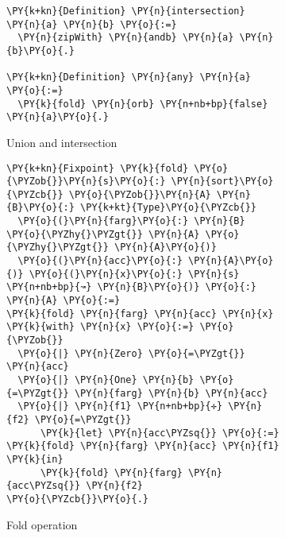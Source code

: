 \begin{figure}
\begin{subfigure}{0.3\textwidth}
\begin{Verbatim}[commandchars=\\\{\}]
\PY{k+kn}{Definition} \PY{n}{intersection} \PY{n}{a} \PY{n}{b} \PY{o}{:=}
  \PY{n}{zipWith} \PY{n}{andb} \PY{n}{a} \PY{n}{b}\PY{o}{.}

\PY{k+kn}{Definition} \PY{n}{any} \PY{n}{a} \PY{o}{:=}
  \PY{k}{fold} \PY{n}{orb} \PY{n+nb+bp}{false} \PY{n}{a}\PY{o}{.}
\end{Verbatim}
  \caption{Union and intersection}
  \label{code:union-intersect}
\end{subfigure}
%
\begin{subfigure}{0.5\textwidth}
\begin{Verbatim}[commandchars=\\\{\}]
\PY{k+kn}{Fixpoint} \PY{k}{fold} \PY{o}{\PYZob{}}\PY{n}{s}\PY{o}{:} \PY{n}{sort}\PY{o}{\PYZcb{}} \PY{o}{\PYZob{}}\PY{n}{A} \PY{n}{B}\PY{o}{:} \PY{k+kt}{Type}\PY{o}{\PYZcb{}}
  \PY{o}{(}\PY{n}{farg}\PY{o}{:} \PY{n}{B} \PY{o}{\PYZhy{}\PYZgt{}} \PY{n}{A} \PY{o}{\PYZhy{}\PYZgt{}} \PY{n}{A}\PY{o}{)}
  \PY{o}{(}\PY{n}{acc}\PY{o}{:} \PY{n}{A}\PY{o}{)} \PY{o}{(}\PY{n}{x}\PY{o}{:} \PY{n}{s} \PY{n+nb+bp}{↝} \PY{n}{B}\PY{o}{)} \PY{o}{:} \PY{n}{A} \PY{o}{:=}
\PY{k}{fold} \PY{n}{farg} \PY{n}{acc} \PY{n}{x} \PY{k}{with} \PY{n}{x} \PY{o}{:=} \PY{o}{\PYZob{}}
  \PY{o}{|} \PY{n}{Zero} \PY{o}{=\PYZgt{}} \PY{n}{acc}
  \PY{o}{|} \PY{n}{One} \PY{n}{b} \PY{o}{=\PYZgt{}} \PY{n}{farg} \PY{n}{b} \PY{n}{acc}
  \PY{o}{|} \PY{n}{f1} \PY{n+nb+bp}{✛} \PY{n}{f2} \PY{o}{=\PYZgt{}}
      \PY{k}{let} \PY{n}{acc\PYZsq{}} \PY{o}{:=} \PY{k}{fold} \PY{n}{farg} \PY{n}{acc} \PY{n}{f1} \PY{k}{in}
      \PY{k}{fold} \PY{n}{farg} \PY{n}{acc\PYZsq{}} \PY{n}{f2}
\PY{o}{\PYZcb{}}\PY{o}{.}
\end{Verbatim}
  \caption{Fold operation}
  \label{code:fold}
\end{subfigure}
%
\begin{subfigure}{0.5\textwidth}
\begin{Verbatim}[commandchars=\\\{\}]

\end{Verbatim}
\end{subfigure}
\end{figure}
